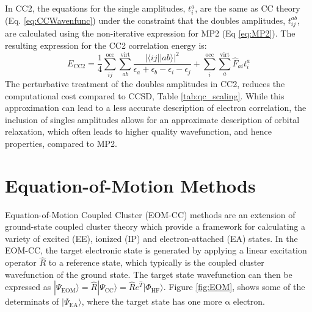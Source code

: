 In CC2, the equations for the single amplitudes, $t^a_i$, are the same as CC theory (Eq. \ref{eq:CCWavenfunc}) under the constraint that the doubles amplitudes, $t^{ab}_{ij}$, are calculated using the non-iterative expression for MP2 (Eq \ref{eq:MP2}). The resulting expression for the CC2 correlation energy is:
\begin{equation}\label{CC2Energy}
    E_{\mathrm{CC2}} = \frac{1}{4}\sum_{ij}^{\mathrm{occ}} \sum_{ab}^{\mathrm{virt}} \frac{|\langle i j || a b \rangle|^2}{\epsilon_a + \epsilon_b - \epsilon_i - \epsilon_j}  + \sum_{i}^{\mathrm{occ}} \sum_{a}^{\mathrm{virt}} \hat{F}_{ai} t^a_i 
\end{equation}
The perturbative treatment of the doubles amplitudes in CC2, reduces the computational cost compared to CCSD, Table \ref{tab:qc_scaling}. While this approximation can lead to a less accurate description of electron correlation, the inclusion of singles amplitudes allows for an approximate description of orbital relaxation, which often leads to higher quality wavefunction, and hence properties, compared to MP2.

\section{Equation-of-Motion Methods} \label{sec:eom_theory}
Equation-of-Motion Coupled Cluster (EOM-CC) methods are an extension of ground-state coupled cluster theory which provide a framework for calculating a variety of excited (EE), ionized (IP) and electron-attached (EA) states. In the EOM-CC, the target electronic state is generated by applying a linear excitation operator $\hat{R}$ to a reference state, which typically is the coupled cluster wavefunction of the ground state. The target state wavefunction can then be expressed as $|\Psi_{\mathrm{EOM}}\rangle = \hat{R} |\Psi_{\mathrm{CC}}\rangle = \hat{R} e^{\hat{T}} |\Phi_{\mathrm{HF}}\rangle$. Figure \ref{fig:EOM}, shows some of the determinats of $| \Psi_{\mathrm{EA}} \rangle$, where the target state has one more $\mathrm{\alpha}$ electron. \\


